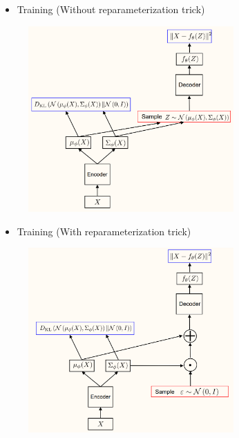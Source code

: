\begin{concept}
    \begin{itemize}
        \item Training (Without reparameterization trick)
    \end{itemize}

    \begin{figure}[H]
        \centering
        \includegraphics[width=0.7\textwidth]{.././assets/11.5.png}
    \end{figure}

    \begin{itemize}
        \item Training (With reparameterization trick)
    \end{itemize}

    \begin{figure}[H]
        \centering
        \includegraphics[width=0.7\textwidth]{.././assets/11.6.png}
    \end{figure}


\end{concept}

